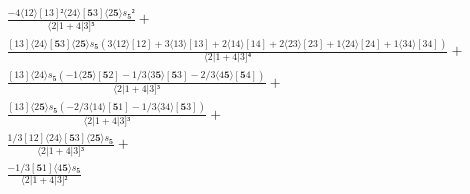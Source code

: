 \documentclass[varwidth, border=5pt]{standalone}
\begin{document}
\begin{my}
$\begin{gathered}
\scriptscriptstyle\frac{-4⟨12⟩[13]²⟨24⟩[𝟓3]⟨2𝟓⟩s_{𝟓}²}{⟨2|1+4|3]⁵} +\\
\scriptscriptstyle\frac{[13]⟨24⟩[𝟓3]⟨2𝟓⟩s_{𝟓}(3⟨12⟩[12]+3⟨13⟩[13]+2⟨14⟩[14]+2⟨23⟩[23]+1⟨24⟩[24]+1⟨34⟩[34])}{⟨2|1+4|3]⁴} +\\
\scriptscriptstyle\frac{[13]⟨24⟩s_{𝟓}(-1⟨2𝟓⟩[𝟓2]-1/3⟨3𝟓⟩[𝟓3]-2/3⟨4𝟓⟩[𝟓4])}{⟨2|1+4|3]³} +\\
\scriptscriptstyle\frac{[13]⟨2𝟓⟩s_{𝟓}(-2/3⟨14⟩[𝟓1]-1/3⟨34⟩[𝟓3])}{⟨2|1+4|3]³} +\\
\scriptscriptstyle\frac{1/3[12]⟨24⟩[𝟓3]⟨2𝟓⟩s_{𝟓}}{⟨2|1+4|3]³} +\\
\scriptscriptstyle\frac{-1/3[𝟓1]⟨4𝟓⟩s_{𝟓}}{⟨2|1+4|3]²} \phantom{+}
\end{gathered}$
\end{my}
\end{document}
